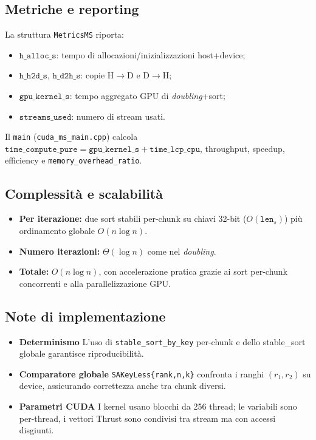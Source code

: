 		\subsection{Metriche e reporting}
			La struttura \texttt{MetricsMS} riporta:
			\begin{itemize}
				\item \(\texttt{h\_alloc\_s}\): tempo di allocazioni/inizializzazioni host+device;
				\item \(\texttt{h\_h2d\_s}\), \(\texttt{h\_d2h\_s}\): copie H$\to$D e D$\to$H;
				\item \(\texttt{gpu\_kernel\_s}\): tempo aggregato GPU di \emph{doubling}+sort;
				\item \(\texttt{streams\_used}\): numero di stream usati.
			\end{itemize}
			Il \texttt{main} (\texttt{cuda\_ms\_main.cpp}) calcola \(\texttt{time\_compute\_pure} = \texttt{gpu\_kernel\_s} + \texttt{time\_lcp\_cpu}\), throughput, speedup, efficiency e \texttt{memory\_overhead\_ratio}.
		
		\subsection{Complessità e scalabilità}
			\begin{itemize}
				\item \textbf{Per iterazione:} due sort stabili per-chunk su chiavi 32-bit ($O(\texttt{len}_s)$) più ordinamento globale $O(n \log n)$.
				\item \textbf{Numero iterazioni:} $\Theta(\log n)$ come nel \emph{doubling}.
				\item \textbf{Totale:} $O(n \log n)$, con accelerazione pratica grazie ai sort per-chunk concorrenti e alla parallelizzazione GPU\@.
			\end{itemize}
		
		\subsection{Note di implementazione}
			\begin{itemize}
				\item \textbf{Determinismo} L’uso di \texttt{stable\_sort\_by\_key} per-chunk e dello stable\_sort globale garantisce riproducibilità.
				\item \textbf{Comparatore globale} \texttt{SAKeyLess\{rank,n,k\}} confronta i ranghi $(r_1,r_2)$ su device, assicurando correttezza anche tra chunk diversi.
				\item \textbf{Parametri CUDA} I kernel usano blocchi da 256 thread; le variabili sono per-thread, i vettori Thrust sono condivisi tra stream ma con accessi disgiunti.
			\end{itemize}
		
